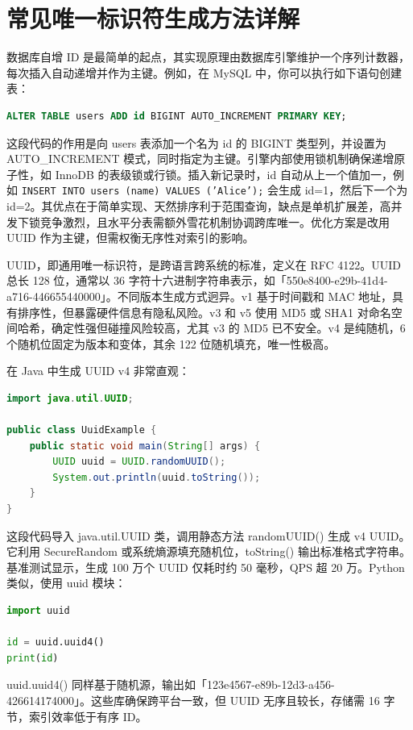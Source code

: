 \chapter{常见唯一标识符生成方法详解}
数据库自增 ID 是最简单的起点，其实现原理由数据库引擎维护一个序列计数器，每次插入自动递增并作为主键。例如，在 MySQL 中，你可以执行如下语句创建表：\par
\begin{lstlisting}[language=sql]
ALTER TABLE users ADD id BIGINT AUTO_INCREMENT PRIMARY KEY;
\end{lstlisting}
这段代码的作用是向 users 表添加一个名为 id 的 BIGINT 类型列，并设置为 AUTO\_{}INCREMENT 模式，同时指定为主键。引擎内部使用锁机制确保递增原子性，如 InnoDB 的表级锁或行锁。插入新记录时，id 自动从上一个值加一，例如 \texttt{INSERT INTO users (name) VALUES ('Alice');} 会生成 id=1，然后下一个为 id=2。其优点在于简单实现、天然排序利于范围查询，缺点是单机扩展差，高并发下锁竞争激烈，且水平分表需额外雪花机制协调跨库唯一。优化方案是改用 UUID 作为主键，但需权衡无序性对索引的影响。\par
UUID，即通用唯一标识符，是跨语言跨系统的标准，定义在 RFC 4122。UUID 总长 128 位，通常以 36 字符十六进制字符串表示，如「550e8400-e29b-41d4-a716-446655440000」。不同版本生成方式迥异。v1 基于时间戳和 MAC 地址，具有排序性，但暴露硬件信息有隐私风险。v3 和 v5 使用 MD5 或 SHA1 对命名空间哈希，确定性强但碰撞风险较高，尤其 v3 的 MD5 已不安全。v4 是纯随机，6 个随机位固定为版本和变体，其余 122 位随机填充，唯一性极高。\par
在 Java 中生成 UUID v4 非常直观：\par
\begin{lstlisting}[language=java]
import java.util.UUID;

public class UuidExample {
    public static void main(String[] args) {
        UUID uuid = UUID.randomUUID();
        System.out.println(uuid.toString());
    }
}
\end{lstlisting}
这段代码导入 java.util.UUID 类，调用静态方法 randomUUID() 生成 v4 UUID。它利用 SecureRandom 或系统熵源填充随机位，toString() 输出标准格式字符串。基准测试显示，生成 100 万个 UUID 仅耗时约 50 毫秒，QPS 超 20 万。Python 类似，使用 uuid 模块：\par
\begin{lstlisting}[language=python]
import uuid

id = uuid.uuid4()
print(id)
\end{lstlisting}
uuid.uuid4() 同样基于随机源，输出如「123e4567-e89b-12d3-a456-426614174000」。这些库确保跨平台一致，但 UUID 无序且较长，存储需 16 字节，索引效率低于有序 ID。\par
